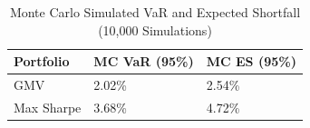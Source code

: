 \begin{table}[H]
\centering
\caption{\label{tab:mc_summary}Monte Carlo Simulated VaR and Expected Shortfall (10,000 Simulations)}
\centering
\fontsize{9}{11}\selectfont
\begin{tabular}[t]{lll}
\toprule
Portfolio & MC VaR (95\%) & MC ES (95\%)\\
\midrule
GMV & 2.02\% & 2.54\%\\
Max Sharpe & 3.68\% & 4.72\%\\
\bottomrule
\end{tabular}
\end{table}
